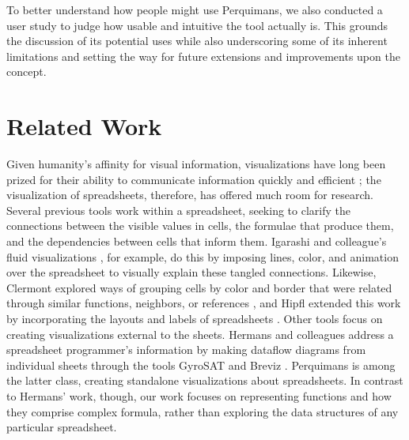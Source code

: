 \documentclass[conference]{IEEEtran}
\newcommand{\toolname}{Perquimans }
\newcommand{\toolnameend}{Perquimans}
\begin{document}
	To better understand how people might use \toolnameend, we also conducted a user study to judge how
	usable and intuitive the tool actually is. This grounds the discussion of its
	potential uses while also underscoring some of its inherent limitations and
	setting the way for future extensions and improvements upon the concept.
	
	\section{Related Work} \label{related-work} Given humanity's affinity for
	visual information, visualizations have long been prized for their ability to
	communicate information quickly and efficient \cite{baeza1999modern}; the
	visualization of spreadsheets, therefore, has offered much room for research.
	Several previous tools work within a spreadsheet, seeking to clarify the
	connections between the visible values in cells, the formulae that produce
	them, and the dependencies between cells that inform them. Igarashi and
	colleague's fluid visualizations \cite{igarashi1998fluid}, for example, do this
	by imposing lines, color, and animation over the spreadsheet to visually
	explain these tangled connections. Likewise, Clermont explored ways of grouping
	cells by color and border that were related through similar functions,
	neighbors, or references \cite{clermont2003scalable}, and Hipfl extended this
	work by incorporating the layouts and labels of spreadsheets
	\cite{hipfl2008using}. Other tools focus on creating visualizations external to
	the sheets. Hermans and colleagues address a spreadsheet programmer's
	information by making dataflow diagrams from individual sheets through the
	tools GyroSAT \cite{hermans2011supporting} and Breviz \cite{hermans2011breviz}.
	\toolname is among the latter class, creating standalone visualizations about
	spreadsheets. In contrast to Hermans' work, though, our work focuses on
	representing functions and how they comprise complex formula, rather than
	exploring the data structures of any particular spreadsheet.  \par
	
\end{document}
